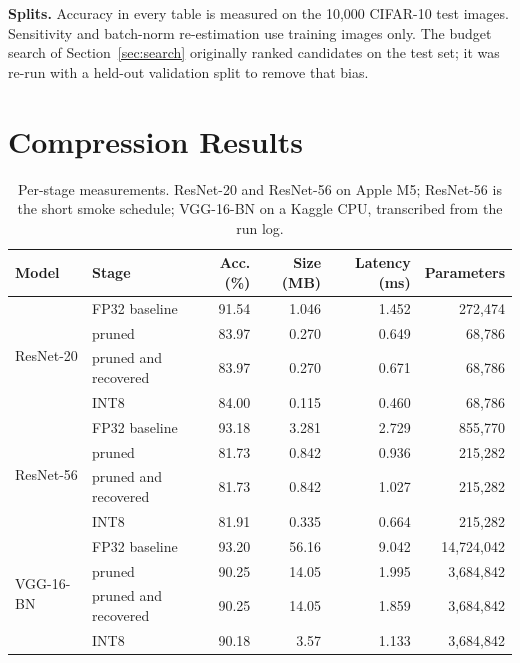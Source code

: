 \documentclass[oneside,a4paper,12pt]{report}
\begin{document}
\textbf{Splits.} Accuracy in every table is measured on the 10,000 CIFAR-10 test images. Sensitivity and batch-norm re-estimation use training images only. The budget search of Section~\ref{sec:search} originally ranked candidates on the test set; it was re-run with a held-out validation split to remove that bias.

\section{Compression Results}
\begin{table}[!htbp]
\centering
\small
\setlength{\tabcolsep}{4pt}
\begin{tabular}{@{}l l r r r r@{}}
\toprule
Model & Stage & Acc. (\%) & Size (MB) & Latency (ms) & Parameters\\
\midrule
\multirow{4}{*}{ResNet-20} & FP32 baseline & 91.54 & 1.046 & 1.452 & 272,474\\
 & pruned & 83.97 & 0.270 & 0.649 & 68,786\\
 & pruned and recovered & 83.97 & 0.270 & 0.671 & 68,786\\
 & INT8 & 84.00 & 0.115 & 0.460 & 68,786\\
\midrule
\multirow{4}{*}{ResNet-56} & FP32 baseline & 93.18 & 3.281 & 2.729 & 855,770\\
 & pruned & 81.73 & 0.842 & 0.936 & 215,282\\
 & pruned and recovered & 81.73 & 0.842 & 1.027 & 215,282\\
 & INT8 & 81.91 & 0.335 & 0.664 & 215,282\\
\midrule
\multirow{4}{*}{VGG-16-BN} & FP32 baseline & 93.20 & 56.16 & 9.042 & 14,724,042\\
 & pruned & 90.25 & 14.05 & 1.995 & 3,684,842\\
 & pruned and recovered & 90.25 & 14.05 & 1.859 & 3,684,842\\
 & INT8 & 90.18 & 3.57 & 1.133 & 3,684,842\\
\bottomrule
\end{tabular}
\caption[Per-stage measurements for the three models.]{Per-stage measurements. ResNet-20 and ResNet-56 on Apple M5; ResNet-56 is the short smoke schedule; VGG-16-BN on a Kaggle CPU, transcribed from the run log.}
\label{tab:results}
\end{table}
\end{document}
